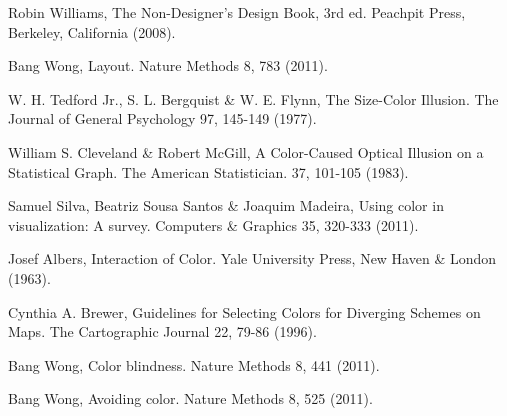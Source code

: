 \documentclass[letterpaper]{report}\usepackage[]{graphicx}\usepackage[]{color}
\begin{document}
\begin{thebibliography}{1}
Robin Williams, The Non-Designer's Design Book, 3rd ed. Peachpit Press, Berkeley, California (2008).

Bang Wong, Layout. Nature Methods 8, 783 (2011).

W. H. Tedford Jr., S. L. Bergquist \& W. E. Flynn, The Size-Color Illusion. The Journal of General Psychology 97, 145-149 (1977).

William S. Cleveland \& Robert McGill, A Color-Caused Optical Illusion on a Statistical Graph. The American Statistician. 37, 101-105 (1983).

Samuel Silva, Beatriz Sousa Santos \& Joaquim Madeira, Using color in visualization: A survey. Computers \& Graphics 35, 320-333 (2011).

Josef Albers, Interaction of Color. Yale University Press, New Haven \& London (1963).

Cynthia A. Brewer, Guidelines for Selecting Colors for Diverging Schemes on Maps. The Cartographic Journal 22, 79-86 (1996).

Bang Wong, Color blindness. Nature Methods 8, 441 (2011).

Bang Wong, Avoiding color. Nature Methods 8, 525 (2011).

\end{thebibliography}
\end{document}
